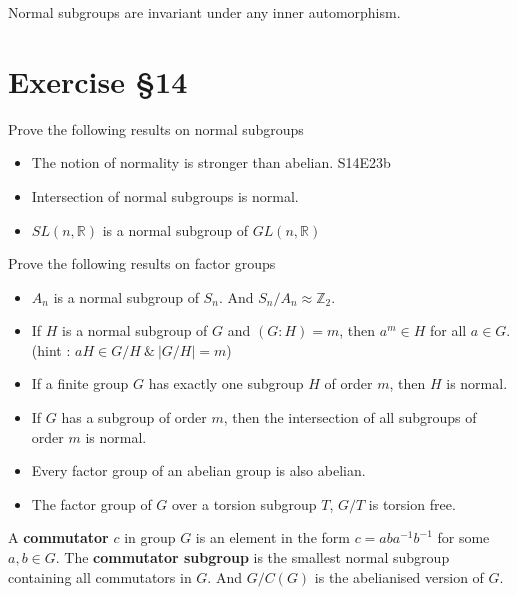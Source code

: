 \begin{remark}
	Normal subgroups are invariant under any inner automorphism.
\end{remark}

\section{Exercise \S14}
\begin{remark}Prove the following results on normal subgroups
	\begin{itemize}
		\item The notion of normality is stronger than abelian. S14E23b
		\item Intersection of normal subgroups is normal.%
		\item $SL(n,\mathbb{R})$ is a normal subgroup of $GL(n,\mathbb{R})$%
	\end{itemize}
\end{remark}

\begin{remark}Prove the following results on factor groups
	\begin{itemize}
		\item $A_n$ is a normal subgroup of $S_n$.
			And $S_n/A_n \approx \mathbb{Z}_2$.%
		\item If $H$ is a normal subgroup of $G$ and $(G:H) = m$, then $a^m \in H$ for all $a \in G$.%
			(hint : $aH \in G/H\ \&\ |G/H| = m$)
		\item If a finite group $G$ has exactly one subgroup $H$ of order $m$, then $H$ is normal.%
		\item If $G$ has a subgroup of order $m$, then the intersection of all subgroups of order $m$ is normal.%
		\item Every factor group of an abelian group is also abelian.%
		\item The factor group of $G$ over a torsion subgroup $T$, $G/T$ is torsion free.%
	\end{itemize}
\end{remark}

\begin{definition}
	A \textbf{commutator} $c$ in group $G$ is an element in the form $c = aba^{-1}b^{-1}$ for some $a,b \in G$.
	The \textbf{commutator subgroup} is the smallest normal subgroup containing all commutators in $G$.
	And $G/C(G)$ is the abelianised version of $G$.
\end{definition}

